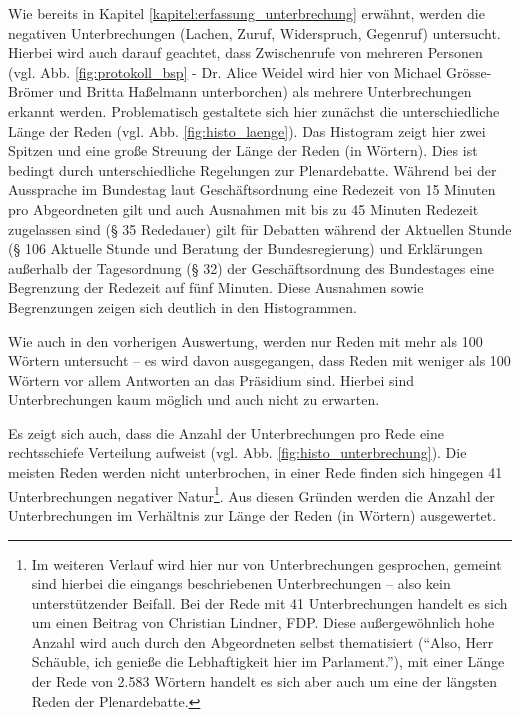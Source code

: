 \documentclass[12pt, 
    twoside=false, 
    bibliography=totoc, 
    numbers=endperiod, 
    headings=normal, 
    toc=chapterentrydotfill
    ]{scrbook}
\begin{document}
Wie bereits in Kapitel \ref{kapitel:erfassung_unterbrechung} erwähnt, werden die negativen Unterbrechungen (Lachen, Zuruf, Widerspruch, Gegenruf) untersucht. Hierbei wird auch darauf geachtet, dass Zwischenrufe von mehreren Personen (vgl. Abb. \ref{fig:protokoll_bsp} - Dr. Alice Weidel wird hier von Michael Grösse-Brömer und Britta Haßelmann unterborchen) als mehrere Unterbrechungen erkannt werden. Problematisch gestaltete sich hier zunächst die unterschiedliche Länge der Reden (vgl. Abb. \ref{fig:histo_laenge}). Das Histogram zeigt hier zwei Spitzen und eine große Streuung der Länge der Reden (in Wörtern).
Dies ist bedingt durch unterschiedliche Regelungen zur Plenardebatte. Während bei der Aussprache im Bundestag laut Geschäftsordnung eine Redezeit von 15 Minuten pro Abgeordneten gilt und auch Ausnahmen mit bis zu 45 Minuten Redezeit zugelassen sind (§ 35 Rededauer) gilt für Debatten während der Aktuellen Stunde (§ 106 Aktuelle Stunde und Beratung der Bundesregierung) und Erklärungen außerhalb der Tagesordnung (§ 32) der Geschäftsordnung des Bundestages \parencite{bundestag_2019} eine Begrenzung der Redezeit auf fünf Minuten. Diese Ausnahmen sowie Begrenzungen zeigen sich deutlich in den Histogrammen.

Wie auch in den vorherigen Auswertung, werden nur Reden mit mehr als 100 Wörtern untersucht -- es wird davon ausgegangen, dass Reden mit weniger als 100 Wörtern vor allem Antworten an das Präsidium sind. Hierbei sind Unterbrechungen kaum möglich und auch nicht zu erwarten.

Es zeigt sich auch, dass die Anzahl der Unterbrechungen pro Rede eine rechtsschiefe Verteilung aufweist (vgl. Abb. \ref{fig:histo_unterbrechung}). Die meisten Reden werden nicht unterbrochen, in einer Rede finden sich hingegen 41 Unterbrechungen negativer Natur\footnote{Im weiteren Verlauf wird hier nur von Unterbrechungen gesprochen, gemeint sind hierbei die eingangs beschriebenen Unterbrechungen -- also kein unterstützender Beifall. Bei der Rede mit 41 Unterbrechungen handelt es sich um einen Beitrag von Christian Lindner, FDP. Diese außergewöhnlich hohe Anzahl wird auch durch den Abgeordneten selbst thematisiert (\enquote{Also, Herr Schäuble, ich genieße die Lebhaftigkeit hier im Parlament.}), mit einer Länge der Rede von 2.583 Wörtern handelt es sich aber auch um eine der längsten Reden der Plenardebatte.}. Aus diesen Gründen werden die Anzahl der Unterbrechungen im Verhältnis zur Länge der Reden (in Wörtern) ausgewertet.
\end{document}
